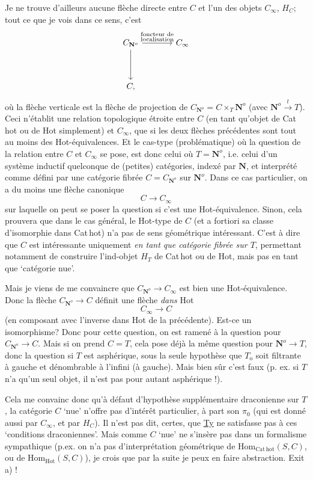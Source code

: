 \documentclass[11pt]{article}
\newcommand{\printedpage}[1]{\marginpar{\footnotesize p.~#1}}
\newcommand{\msp}[1]{\marginpar{\footnotesize [#1]}}
\newcommand{\CNo}{C_{\mathbf{N}^{o}}}
\begin{document}
\printedpage{69}

\msp{page 108}
Je ne trouve d'ailleurs aucune flèche directe entre $C$ et l'un des objets $C_{\infty}$, $H_{C}$; tout ce que je vois dans ce sens, c'est
\[
\begin{tikzcd}[column sep=large, row sep=huge]
\CNo \arrow[r, "{\substack{\text{foncteur de}\\ \text{localisation}}}"] \arrow[d] & C_{\infty} \\
C, &
\end{tikzcd}
\]
où la flèche verticale est la flèche de projection de $\CNo = C \times_{T} \mathbf{N}^{o}$ (avec $\mathbf{N}^{o} \xrightarrow{\ t\ } T$). Ceci n'établit une relation topologique étroite entre $C$ (en tant qu'objet de Cat\,hot ou de Hot simplement) et $C_{\infty}$, que si les deux flèches précédentes sont tout au moins des Hot-équivalences. Et le cas-type (problématique) où la question de la relation entre $C$ et $C_{\infty}$ se pose, est donc celui où $T = \mathbf{N}^{o}$, i.e. celui d'un système inductif quelconque de (petites) catégories, indexé par $\mathbf{N}$, et interprété comme défini par une catégorie fibrée $C = \CNo$ sur $\mathbf{N}^{o}$. Dans ce cas particulier, on a du moins une flèche canonique
\[
C \longrightarrow C_{\infty}
\]
sur laquelle on peut se poser la question si c'est
\msp{page 109}
une Hot-équivalence. Sinon, cela prouvera que dans le cas général, le Hot-type de $C$ (et a fortiori sa classe d'isomorphie dans Cat\,hot) n'a pas de sens géométrique intéressant. C'est à dire que $C$ est intéressante uniquement \textit{en tant que catégorie fibrée sur $T$}, permettant notamment de construire l'ind-objet $H_{T}$ de Cat\,hot ou de Hot, mais pas en tant que `catégorie nue'.

Mais je viens de me convaincre que $\CNo \longrightarrow C_{\infty}$ est bien une Hot-équivalence. Donc la flèche $\CNo \longrightarrow C$ définit une flèche \textit{dans} Hot
\[
C_{\infty} \longrightarrow C
\]
(en composant avec l'inverse dans Hot de la précédente). Est-ce un isomorphisme? Donc pour cette question, on est ramené à la question pour $\CNo \longrightarrow C$. Mais si on prend $C = T$, cela pose déjà la même question pour $\mathbf{N}^{o} \longrightarrow T$, donc la question si $T$ est asphérique, sous la seule hypothèse que $T_{\mathrm{o}}$ soit filtrante à gauche et dénombrable à l'infini (à gauche). Mais bien sûr c'est faux (p. ex. si $T$ n'a qu'un seul objet, il n'est pas pour autant asphérique !).

Cela me convainc donc qu'à défaut
\printedpage{70}
\msp{page 110}
d'hypothèse supplémentaire draconienne sur $T$, la catégorie $C$ `nue' n'offre pas d'intérêt particulier, à part son $\pi_{0}$ (qui est donné aussi par $C_{\infty}$, et par $H_{C}$). Il n'est pas dit, certes, que \underline{Ty} ne satisfasse pas à ces `conditions draconiennes'. Mais comme $C$ `nue' ne s'insère pas dans un formalisme sympathique (p.ex. on n'a pas d'interprétation géométrique de $\mathrm{Hom}_{\mathrm{Cat\,hot}}(S,C)$, ou de $\mathrm{Hom}_{\mathrm{Hot}}(S,C)$), je crois que par la suite je peux en faire abstraction. Exit a) !
\end{document}
